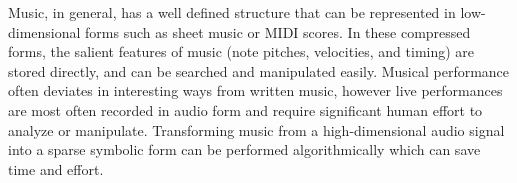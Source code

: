 Music, in general, has a well defined structure that can be represented in low-dimensional forms such as sheet music or \ac{MIDI} scores. In these compressed forms, the salient features of music (note pitches, velocities, and timing) are stored directly, and can be searched and manipulated easily. Musical performance often deviates in interesting ways from written music, however live performances are most often recorded in audio form and require significant human effort to analyze or manipulate. Transforming music from a high-dimensional audio signal into a sparse symbolic form can be performed algorithmically which can save time and effort.
